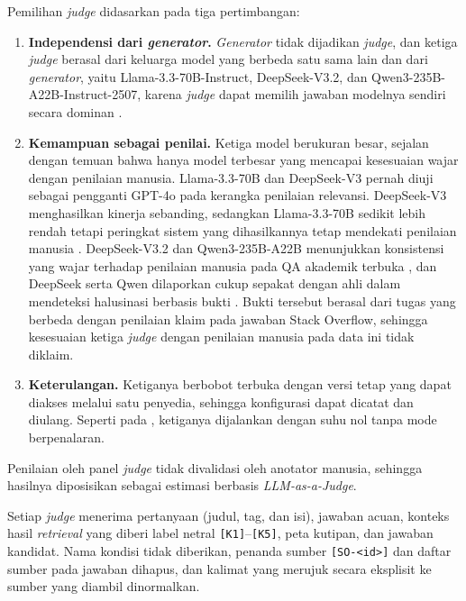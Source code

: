 Pemilihan \emph{judge} didasarkan pada tiga pertimbangan:
\begin{enumerate}
    \item \textbf{Independensi dari \emph{generator}.} \emph{Generator} tidak dijadikan \emph{judge}, dan ketiga \emph{judge} berasal dari keluarga model yang berbeda satu sama lain dan dari \emph{generator}, yaitu Llama-3.3-70B-Instruct, DeepSeek-V3.2, dan Qwen3-235B-A22B-Instruct-2507, karena \emph{judge} dapat memilih jawaban modelnya sendiri secara dominan \autocite{LiChenDolata2026}.
    \item \textbf{Kemampuan sebagai penilai.} Ketiga model berukuran besar, sejalan dengan temuan \textcite{Thakur2025} bahwa hanya model terbesar yang mencapai kesesuaian wajar dengan penilaian manusia. Llama-3.3-70B dan DeepSeek-V3 pernah diuji sebagai pengganti GPT-4o pada kerangka penilaian relevansi. DeepSeek-V3 menghasilkan kinerja sebanding, sedangkan Llama-3.3-70B sedikit lebih rendah tetapi peringkat sistem yang dihasilkannya tetap mendekati penilaian manusia \autocite{Farzi2025}. DeepSeek-V3.2 dan Qwen3-235B-A22B menunjukkan konsistensi yang wajar terhadap penilaian manusia pada QA akademik terbuka \autocite{AISEBench2026}, dan DeepSeek serta Qwen dilaporkan cukup sepakat dengan ahli dalam mendeteksi halusinasi berbasis bukti \autocite{ZhuHydro2026}. Bukti tersebut berasal dari tugas yang berbeda dengan penilaian klaim pada jawaban Stack Overflow, sehingga kesesuaian ketiga \emph{judge} dengan penilaian manusia pada data ini tidak diklaim.
    \item \textbf{Keterulangan.} Ketiganya berbobot terbuka dengan versi tetap yang dapat diakses melalui satu penyedia, sehingga konfigurasi dapat dicatat dan diulang. Seperti pada \textcite{ZhuHydro2026}, ketiganya dijalankan dengan suhu nol tanpa mode berpenalaran.
\end{enumerate}
Penilaian oleh panel \emph{judge} tidak divalidasi oleh anotator manusia, sehingga hasilnya diposisikan sebagai estimasi berbasis \emph{LLM-as-a-Judge}.

Setiap \emph{judge} menerima pertanyaan (judul, tag, dan isi), jawaban acuan, konteks hasil \emph{retrieval} yang diberi label netral \texttt{[K1]}--\texttt{[K5]}, peta kutipan, dan jawaban kandidat. Nama kondisi tidak diberikan, penanda sumber \texttt{[SO-\textless id\textgreater]} dan daftar sumber pada jawaban dihapus, dan kalimat yang merujuk secara eksplisit ke sumber yang diambil dinormalkan.

